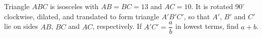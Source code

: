 Triangle $ABC$ is isosceles with $AB=BC=13$ and $AC=10$. It is rotated $90^\circ$ clockwise, dilated, and translated to form triangle $A'B'C'$, so that $A'$, $B'$ and $C'$ lie on sides $AB$, $BC$ and $AC$, respectively. If $A'C'=\dfrac ab$ in lowest terms, find $a+b$.
